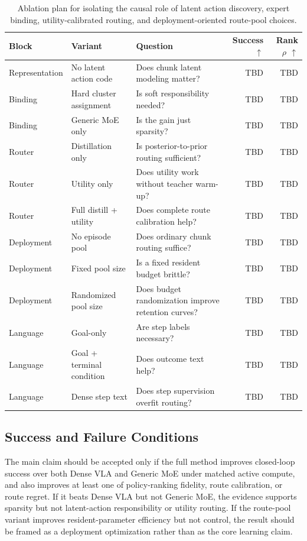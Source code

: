 \documentclass[10pt]{article}
\begin{document}
\begin{table}[t]
\centering
\caption{Ablation plan for isolating the causal role of latent action discovery, expert binding, utility-calibrated routing, and deployment-oriented route-pool choices.}
\label{tab:ablation}
\small
\begin{tabular}{lllrr}
\toprule
Block & Variant & Question & Success $\uparrow$ & Rank $\rho$ $\uparrow$ \\
\midrule
Representation & No latent action code & Does chunk latent modeling matter? & TBD & TBD \\
Binding & Hard cluster assignment & Is soft responsibility needed? & TBD & TBD \\
Binding & Generic MoE only & Is the gain just sparsity? & TBD & TBD \\
Router & Distillation only & Is posterior-to-prior routing sufficient? & TBD & TBD \\
Router & Utility only & Does utility work without teacher warm-up? & TBD & TBD \\
Router & Full distill + utility & Does complete route calibration help? & TBD & TBD \\
Deployment & No episode pool & Does ordinary chunk routing suffice? & TBD & TBD \\
Deployment & Fixed pool size & Is a fixed resident budget brittle? & TBD & TBD \\
Deployment & Randomized pool size & Does budget randomization improve retention curves? & TBD & TBD \\
Language & Goal-only & Are step labels necessary? & TBD & TBD \\
Language & Goal + terminal condition & Does outcome text help? & TBD & TBD \\
Language & Dense step text & Does step supervision overfit routing? & TBD & TBD \\
\bottomrule
\end{tabular}
\end{table}

\subsection{Success and Failure Conditions}

The main claim should be accepted only if the full method improves closed-loop success over both Dense VLA and Generic MoE under matched active compute, and also improves at least one of policy-ranking fidelity, route calibration, or route regret. If it beats Dense VLA but not Generic MoE, the evidence supports sparsity but not latent-action responsibility or utility routing. If the route-pool variant improves resident-parameter efficiency but not control, the result should be framed as a deployment optimization rather than as the core learning claim.
\end{document}
